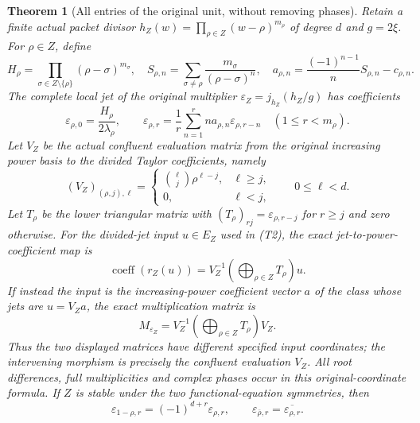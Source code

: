 \documentclass[11pt]{article}
\newtheorem{theorem}{Theorem}[section]
\begin{document}
\begin{theorem}[All entries of the original unit, without removing phases]
Retain a finite actual packet divisor
$h_Z(w)=\prod_{\rho\in Z}(w-\rho)^{m_\rho}$ of degree $d$ and
$g=2\xi$. For $\rho\in Z$, define
\[
 H_\rho=\prod_{\sigma\in Z\setminus\{\rho\}}(\rho-\sigma)^{m_\sigma},
 \quad S_{\rho,n}=\sum_{\sigma\ne\rho}
                    \frac{m_\sigma}{(\rho-\sigma)^n},\quad
 a_{\rho,n}=\frac{(-1)^{n-1}}nS_{\rho,n}-c_{\rho,n}.
\]
The complete local jet of the original multiplier
$\varepsilon_Z=j_{h_Z}(h_Z/g)$ has coefficients
\[
 \varepsilon_{\rho,0}=\frac{H_\rho}{2\lambda_\rho},\qquad
 \varepsilon_{\rho,r}=\frac1r\sum_{n=1}^r
                  n a_{\rho,n}\varepsilon_{\rho,r-n}
       \quad(1\leq r<m_\rho).\tag{U1}
\]
Let $V_Z$ be the actual confluent evaluation matrix from the original
increasing power basis to the divided Taylor coefficients, namely
\[
 (V_Z)_{(\rho,j),\ell}=
 \begin{cases}\binom\ell j\rho^{\ell-j},&\ell\geq j,\\0,&\ell<j,
 \end{cases}
 \qquad 0\leq\ell<d.
\]
Let $T_\rho$ be the lower triangular matrix with
$(T_\rho)_{rj}=\varepsilon_{\rho,r-j}$ for $r\geq j$ and zero
otherwise. For the divided-jet input $u\in E_Z$ used in (T2), the exact
jet-to-power-coefficient map is
\[
 \operatorname{coeff}(r_Z(u))
   =V_Z^{-1}\!\left(\bigoplus_{\rho\in Z}T_\rho\right)u.
\]
If instead the input is the increasing-power coefficient vector $a$ of
the class whose jets are $u=V_Za$, the exact multiplication matrix is
\[
 \boxed{\quad M_{\varepsilon_Z}
     =V_Z^{-1}\!\left(\bigoplus_{\rho\in Z}T_\rho\right)V_Z.\quad}
 \tag{U2}
\]
Thus the two displayed matrices have different specified input coordinates;
the intervening morphism is precisely the confluent evaluation $V_Z$.
All root differences, full multiplicities and complex phases occur in
this original-coordinate formula. If $Z$ is stable under the two
functional-equation symmetries, then
\[
 \varepsilon_{1-\rho,r}=(-1)^{d+r}\varepsilon_{\rho,r},
 \qquad \varepsilon_{\bar\rho,r}=
                         \overline{\varepsilon_{\rho,r}}.\tag{U3}
\]
\end{theorem}
\end{document}
